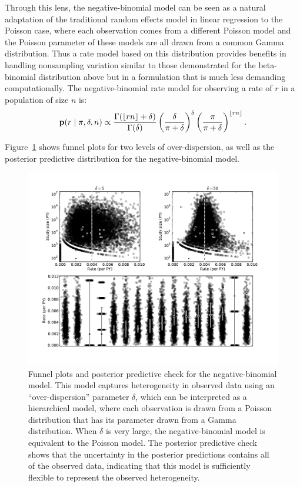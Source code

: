 Through this lens, the negative-binomial model can be seen as a
natural adaptation of the traditional random effects model in linear
regression to the Poisson case, where each observation comes from a
different Poisson model and the Poisson parameter of these models are
all drawn from a common Gamma distribution. Thus a rate model based on
this distribution provides benefits in handling nonsampling variation
similar to those demonstrated for the beta-binomial distribution
above but in a formulation that is much less demanding
computationally.  The negative-binomial rate model for observing a
rate of $r$ in a population of size $n$ is:
\[
\mathbf{p}(r\;|\; \pi, \delta, n) \propto
 \frac{\Gamma(\lfloor rn \rfloor+\delta)}{\Gamma(\delta)}
 \left(\frac{\delta}{\pi+\delta}\right)^\delta \left(\frac{\pi}{\pi+\delta}\right)^{\lfloor rn\rfloor}.
\]

Figure~\ref{rate-model-negative-binomial-funnel} shows funnel plots
for two levels of over-dispersion, as well as the posterior predictive
distribution for the negative-binomial model.

\begin{figure}[ht]
\begin{center}
\includegraphics[width=\textwidth]{negative-binomial-funnel.pdf}

\end{center}
\caption{Funnel plots and posterior predictive check for the
  negative-binomial model. This model captures heterogeneity in
  observed data using an ``over-dispersion'' parameter $\delta$, which
  can be interpreted as a hierarchical model, where each observation
  is drawn from a Poisson distribution that has its parameter drawn
  from a Gamma distribution.  When $\delta$ is very large, the
  negative-binomial model is equivalent to the Poisson model.  The
  posterior predictive check shows that the uncertainty in the
  posterior predictions contains all of the observed data, indicating
  that this model is sufficiently flexible to represent the observed
  heterogeneity.} \label{rate-model-negative-binomial-funnel}
\end{figure}

